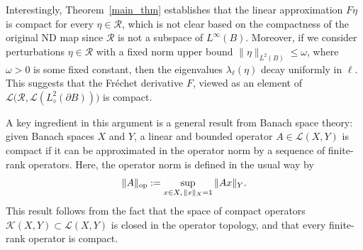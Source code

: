 \documentclass[reqno]{amsart}
\numberwithin{equation}{section}
\numberwithin{figure}{section}
\numberwithin{table}{section}
\theoremstyle{plain}
\theoremstyle{definition}
\theoremstyle{remark}
\newcommand{\sphe}{{\partial B}}
\begin{document}
Interestingly, Theorem~\ref{main_thm} establishes that the linear approximation \( F \eta \) is compact for every \( \eta \in \mathcal{R} \), which is not clear based on the compactness of the original ND map since \( \mathcal{R} \) is not a subspace of \( L^\infty(B) \).
%
Moreover, if we consider perturbations \( \eta \in \mathcal{R} \) with a fixed norm upper bound \( \| \eta \|_{L^2(B)} \leq \omega \), where \( \omega > 0 \) is some fixed constant, then the eigenvalues \( \lambda_\ell(\eta) \) decay uniformly in \( \ell \).
%
This suggests that the Fr\'echet derivative \( F \), viewed as an element of  \( \mathscr{L}\big( \mathcal{R}, \mathscr{L}(L^2_\diamond(\sphe)) \big) \) is compact.
%


A key ingredient in this argument is a general result from Banach space theory: given Banach spaces \( X \) and \( Y \), a linear and bounded operator \( A \in \mathscr{L}(X, Y) \) is compact if it can be approximated in the operator norm by a sequence of finite-rank operators. 
%
Here, the operator norm is defined in the usual way by
%
\[ \| A \|_{\rm op} := \sup_{x \in X, \, \| x \|_X=1} \| Ax \|_Y. \]
%
This result follows from the fact that the space of compact operators \( \mathscr{K}(X, Y) \subset \mathscr{L}(X, Y) \) is closed in the operator topology, and that every finite-rank operator is compact.
%
\end{document}
